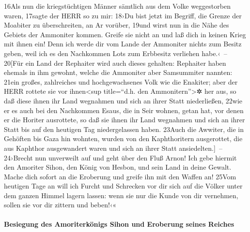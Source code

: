 16Als nun die kriegstüchtigen Männer sämtlich aus dem Volke weggestorben
waren, 17sagte der HERR so zu mir: 18›Du bist jetzt im Begriff, die
Grenze der Moabiter zu überschreiten, an Ar vorüber, 19und wirst nun in
die Nähe des Gebiets der Ammoniter kommen. Greife sie nicht an und laß
dich in keinen Krieg mit ihnen ein! Denn ich werde dir vom Lande der
Ammoniter nichts zum Besitz geben, weil ich es den Nachkommen Lots zum
Erbbesitz verliehen habe.‹~-- 20{[}Für ein Land der Rephaiter wird auch
dieses gehalten: Rephaiter haben ehemals in ihm gewohnt, welche die
Ammoniter aber Samsummiter nannten: 21ein großes, zahlreiches und
hochgewachsenes Volk wie die Enakiter; aber der HERR rottete sie vor
ihnen\textless sup title=``d.h. den Ammonitern''\textgreater✲ her aus,
so daß diese ihnen ihr Land wegnahmen und sich an ihrer Statt
niederließen, 22wie er es auch bei den Nachkommen Esaus, die in Seir
wohnen, getan hat, vor denen er die Horiter ausrottete, so daß sie ihnen
ihr Land wegnahmen und sich an ihrer Statt bis auf den heutigen Tag
niedergelassen haben. 23Auch die Awwiter, die in Gehöften bis Gaza hin
wohnten, wurden von den Kaphthoritern ausgerottet, die aus Kaphthor
ausgewandert waren und sich an ihrer Statt ansiedelten.{]}~-- 24›Brecht
nun unverweilt auf und geht über den Fluß Arnon! Ich gebe hiermit den
Amoriter Sihon, den König von Hesbon, und sein Land in deine Gewalt.
Mache dich sofort an die Eroberung und greife ihn mit den Waffen an!
25Vom heutigen Tage an will ich Furcht und Schrecken vor dir sich auf
die Völker unter dem ganzen Himmel lagern lassen: wenn sie nur die Kunde
von dir vernehmen, sollen sie vor dir zittern und beben!‹«

\hypertarget{besiegung-des-amoriterkuxf6nigs-sihon-und-eroberung-seines-reiches}{%
\paragraph{Besiegung des Amoriterkönigs Sihon und Eroberung seines
Reiches}\label{besiegung-des-amoriterkuxf6nigs-sihon-und-eroberung-seines-reiches}}

